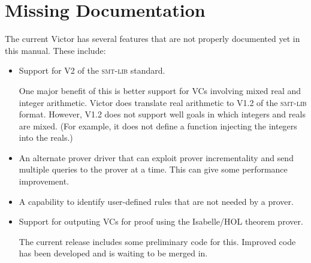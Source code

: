 \documentclass[12pt,fleqn]{article}
\newcommand{\smtlib}{\textsc{smt-lib}}
\begin{document}
\section{Missing Documentation}
The current Victor has several features that are not properly documented
yet in this manual.  These include:
\begin{itemize}
\item Support for V2 of the \smtlib{} standard. 

  One major benefit of this is better support for VCs involving mixed
  real and integer arithmetic.  Victor does translate real arithmetic
  to V1.2 of the \smtlib{} format. However, V1.2 does not support well
  goals in which integers and reals are mixed. (For example, it does
  not define a function injecting the integers into the reals.)

\item An alternate prover driver that can exploit prover
  incrementality and send multiple queries to the prover at a time.
  This can give some performance improvement.

\item A capability to identify user-defined rules that are not needed
  by a prover.
  
\item Support for outputing VCs for proof using the Isabelle/HOL
  theorem prover.

  The current release includes some preliminary code for this.
  Improved code has been developed and is waiting to be merged in.
\end{itemize}





\end{document}
